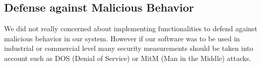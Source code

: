 \subsection{Defense against Malicious Behavior}

We did not really concerned about implementing functionalities to defend against malicious behavior in our system. However if our software was to be used in industrial or commercial level many security measurements should be taken into account such as DOS (Denial of Service) or MitM (Man in the Middle) attacks.\\